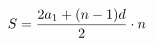 \documentclass[preview]{standalone}
\begin{document}
\begin{align*}
\special{dvisvgm:raw <g id='unique000'>}S=\frac{2a_1+(n-1)d}{2}\cdot n\special{dvisvgm:raw </g>}
\end{align*}
\end{document}
